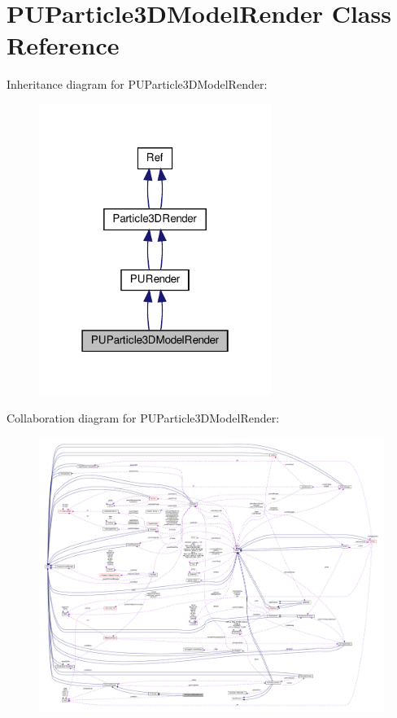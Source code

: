 \hypertarget{classPUParticle3DModelRender}{}\section{P\+U\+Particle3\+D\+Model\+Render Class Reference}
\label{classPUParticle3DModelRender}


Inheritance diagram for P\+U\+Particle3\+D\+Model\+Render\+:
\nopagebreak
\begin{figure}[H]
\begin{center}
\leavevmode
\includegraphics[width=214pt]{classPUParticle3DModelRender__inherit__graph}
\end{center}
\end{figure}


Collaboration diagram for P\+U\+Particle3\+D\+Model\+Render\+:
\nopagebreak
\begin{figure}[H]
\begin{center}
\leavevmode
\includegraphics[width=350pt]{classPUParticle3DModelRender__coll__graph}
\end{center}
\end{figure}
